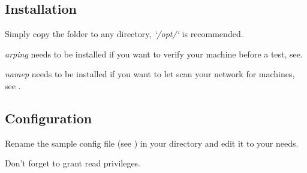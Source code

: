 
\clearpage
\breakpoint\subsection{Installation} 
Simply copy the \sw folder to any directory, \textit{`/opt/`} is recommended.

\emph{arping} needs to be installed if you want to verify your machine before a test, see.

\emph{namep} needs to be installed if you want to let \sw scan your network for machines, see .

\breakpoint\subsection{Configuration}\label{sec:configuration}
Rename the sample config file (see ) in your \sw directory and edit it to your needs.

\hint Don't forget to grant read privileges.


